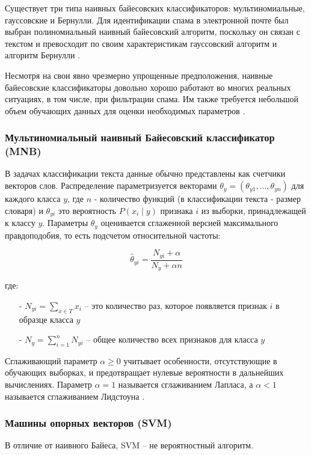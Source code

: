 Существует три типа наивных байесовских классификаторов: мультиномиальные, 
гауссовские и Бернулли. Для идентификации спама в электронной почте 
был выбран полиномиальный наивный байесовский алгоритм, поскольку он 
связан с текстом и превосходит по своим характеристикам гауссовский 
алгоритм и алгоритм Бернулли \cite{IEEE}.

Несмотря на свои явно чрезмерно упрощенные предположения, 
наивные байесовские классификаторы довольно хорошо работают 
во многих реальных ситуациях, в том числе, при фильтрации 
спама. Им также требуется небольшой объем обучающих 
данных для оценки необходимых параметров \cite{scikitMNB}.

\subsubsection{Мультиномиальный наивный Байесовский классификатор (MNB)}
В задачах классификации текста данные обычно представлены как счетчики векторов слов. 
Распределение параметризуется векторами $\theta_y = (\theta_{y1},\ldots,\theta_{yn})$ 
для каждого класса ${y}$, где ${n}$ - количество функций (в 
классификации текста - размер словаря) и $\theta_{yi}$ это вероятность 
$P(x_i \mid y)$ признака ${i}$ из выборки, принадлежащей к классу ${y}$.
Параметры $\theta_y$ оценивается сглаженной версией максимального правдоподобия, 
то есть подсчетом относительной частоты:

\begin{equation}\label{eq4}
    \hat{\theta}_{yi} = \frac{ N_{yi} + \alpha}{N_y + \alpha n}
\end{equation}

где:
\begin{itemize}
    \item[-] $N_{yi} = \sum_{x \in T} x_i$ -- это количество раз, 
    которое появляется признак ${i}$ в образце класса ${y}$
    \item[-] $N_{y} = \sum_{i=1}^{n} N_{yi}$ -- общее количество всех признаков для класса ${y}$
\end{itemize}

Сглаживающий параметр $\alpha \ge 0$ учитывает особенности, отсутствующие 
в обучающих выборках, и предотвращает нулевые вероятности в дальнейших 
вычислениях. Параметр $\alpha = 1$ называется сглаживанием Лапласа, а $\alpha < 1$ 
называется сглаживанием Лидстоуна \cite{scikitMNB}.

\subsubsection{Машины опорных векторов (SVM)}
В отличие от наивного Байеса, SVM -- не вероятностный алгоритм.

